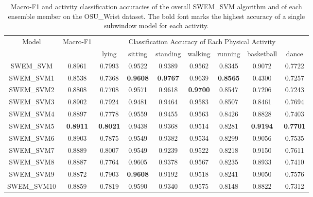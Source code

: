\documentclass[letterpaper]{article}
\begin{document}
\begin{table*}[!htpb]
\small
\centering
\begin{tabular}{|c|c|c|c|c|c|c|c|c|}  \hline
\multicolumn{1}{|c|}{\multirow{2}{*}{Model}} & 
\multicolumn{1}{|c|}{\multirow{2}{*}{Macro-F1}} &
\multicolumn{7}{|c|}{Classification Accuracy of Each Physical Activity} \\ \cline{3-9}
          &       & lying      & sitting    & standing   & walking    & running    & basketball & dance \\ \hline
SWEM\_SVM & 0.8961 & 0.7993     & 0.9522     & 0.9389     & 0.9562 & 0.8345     & 0.9072     & 0.7722 \\ \hline 
SWEM\_SVM1 & 0.8538 & 0.7368     & \bf 0.9608 & \bf 0.9767 & 0.9639     & \bf 0.8565 & 0.4300     & 0.7257 \\ 
SWEM\_SVM2 & 0.8808 & 0.7708     & 0.9571     & 0.9618     & \bf 0.9700 & 0.8547     & 0.7206     & 0.7243 \\ 
SWEM\_SVM3 & 0.8902 & 0.7924     & 0.9481     & 0.9464     & 0.9583     & 0.8507     & 0.8461     & 0.7694 \\ 
SWEM\_SVM4 & 0.8897 & 0.7778     & 0.9559     & 0.9455     & 0.9563     & 0.8426     & 0.8828     & 0.7403 \\
SWEM\_SVM5 & {\bf 0.8911} & \bf{0.8021} & 0.9438     & 0.9368     & 0.9514     & 0.8281     & \bf 0.9194 & \bf 0.7701 \\ 
SWEM\_SVM6 & 0.8903 & 0.7875     & 0.9549     & 0.9382     & 0.9534     & 0.8299     & 0.9056     & 0.7535 \\ 
SWEM\_SVM7 & 0.8889 & 0.8007     & 0.9549     & 0.9239     & 0.9522     & 0.8218     & 0.9150     & 0.7611 \\ 
SWEM\_SVM8 & 0.8887 & 0.7764     & 0.9605     & 0.9378     & 0.9567     & 0.8235     & 0.8933     & 0.7410 \\ 
SWEM\_SVM9 & 0.8872 & 0.7903     & \bf 0.9608 & 0.9192     & 0.9518     & 0.8241     & 0.9050     & 0.7576 \\ 
SWEM\_SVM10 & 0.8859 & 0.7819    & 0.9590     & 0.9340     & 0.9575     & 0.8148     & 0.8822     & 0.7312 \\ \hline
\end{tabular}
\caption{Macro-F1 and activity classification accuracies of the overall SWEM\_SVM algorithm and of each ensemble member on the OSU\_Wrist dataset. The bold font marks the highest accuracy of a single subwindow model for each activity.}
\label{tbl:actacc_osu_wrist_svm}
\end{table*}
\end{document}
